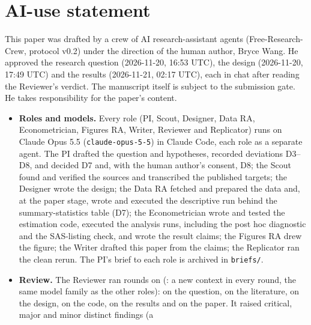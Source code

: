 \section*{AI-use statement}

This paper was drafted by a crew of AI research-assistant agents
(Free-Research-Crew, protocol v0.2) under the direction of the human author, Bryce Wang.
He approved the research question (2026-11-20, 16:53 UTC), the design (2026-11-20,
17:49 UTC) and the results (2026-11-21, 02:17 UTC), each in chat after
reading the Reviewer's verdict. The manuscript itself is subject to the submission gate. He takes responsibility for the paper's content.

\begin{itemize}
  \item \textbf{Roles and models.} Every role (PI, Scout, Designer, Data RA, Econometrician,
        Figures RA, Writer, Reviewer and Replicator) runs on Claude Opus 5.5
        (\texttt{claude-opus-5-5}) in Claude Code, each role as a separate agent. The PI
        drafted the question and hypotheses, recorded deviations D3--D8, and decided D7 and, with the human author's consent, D8; the Scout
        found and verified the sources and transcribed the published targets; the Designer
        wrote the design; the Data RA fetched and prepared the data and, at the paper stage, wrote and
        executed the descriptive run behind the summary-statistics table (D7); the Econometrician
        wrote and tested the estimation code, executed the analysis runs, including the
        post hoc diagnostic and the SAS-listing check, and wrote the result claims; the
        Figures RA drew the figure; the Writer drafted this paper from the claims; the
        Replicator ran the clean rerun. The PI's brief to each role is
        archived in \texttt{briefs/}.
  \item \textbf{Review.} The Reviewer ran \CrewReviewRounds{} rounds on
        \CrewReviewerModels{} (\CrewReviewIndependence{}: a new context in every round, the
        same model family as the other roles): \CrewRoundsQuestion{} on the question,
        \CrewRoundsLiterature{} on the literature, \CrewRoundsDesign{} on the design,
        \CrewRoundsCode{} on the code, \CrewRoundsResults{} on the results and
        \CrewRoundsPaper{} on the paper. It raised \CrewFindingsCritical{} critical,
        \CrewFindingsMajor{} major and \CrewFindingsMinor{} minor distinct findings (a

\end{itemize}
